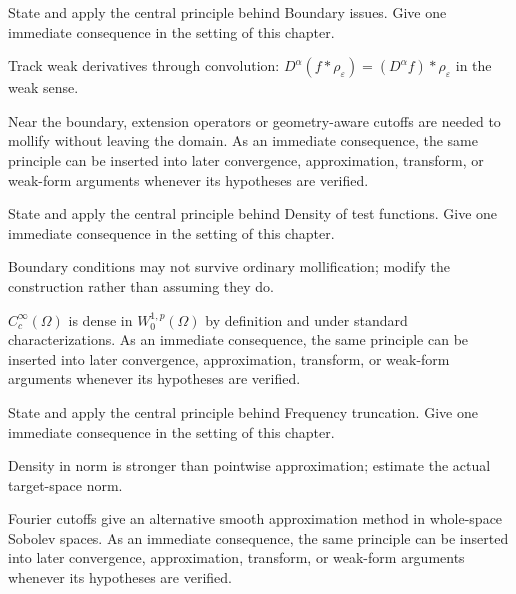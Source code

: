\begin{exercise}\label{exr:iii22-05}
State and apply the central principle behind Boundary issues. Give one immediate consequence in the setting of this chapter.
\end{exercise}
\begin{hint}
Track weak derivatives through convolution: \(D^\alpha(f*\rho_\varepsilon)=(D^\alpha f)*\rho_\varepsilon\) in the weak sense.
\end{hint}
\begin{solution}
Near the boundary, extension operators or geometry-aware cutoffs are needed to mollify without leaving the domain. As an immediate consequence, the same principle can be inserted into later convergence, approximation, transform, or weak-form arguments whenever its hypotheses are verified.
\end{solution}

\begin{exercise}\label{exr:iii22-06}
State and apply the central principle behind Density of test functions. Give one immediate consequence in the setting of this chapter.
\end{exercise}
\begin{hint}
Boundary conditions may not survive ordinary mollification; modify the construction rather than assuming they do.
\end{hint}
\begin{solution}
$C_c^\infty(\Omega)$ is dense in $W_0^{1,p}(\Omega)$ by definition and under standard characterizations. As an immediate consequence, the same principle can be inserted into later convergence, approximation, transform, or weak-form arguments whenever its hypotheses are verified.
\end{solution}

\begin{exercise}\label{exr:iii22-07}
State and apply the central principle behind Frequency truncation. Give one immediate consequence in the setting of this chapter.
\end{exercise}
\begin{hint}
Density in norm is stronger than pointwise approximation; estimate the actual target-space norm.
\end{hint}
\begin{solution}
Fourier cutoffs give an alternative smooth approximation method in whole-space Sobolev spaces. As an immediate consequence, the same principle can be inserted into later convergence, approximation, transform, or weak-form arguments whenever its hypotheses are verified.
\end{solution}

